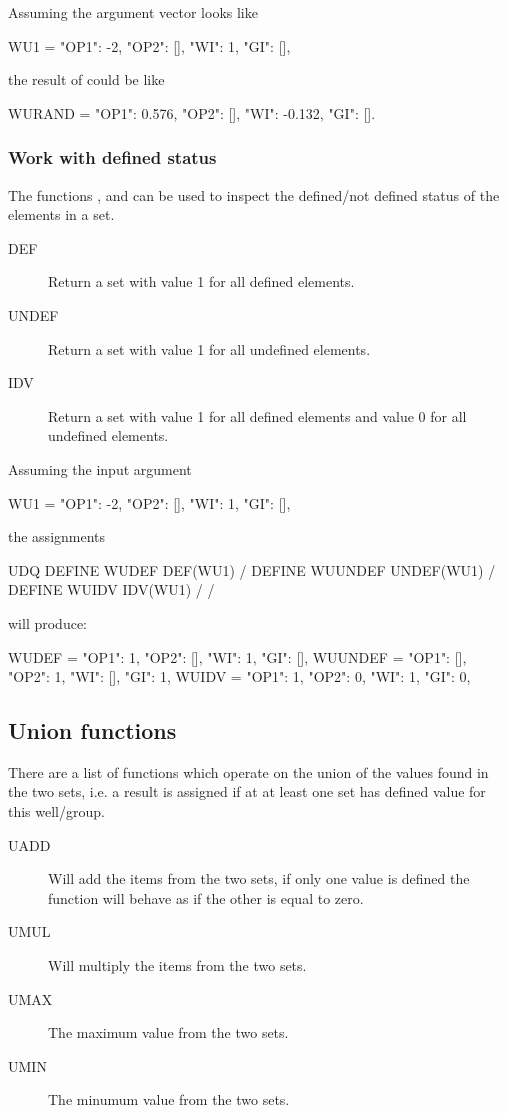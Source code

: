 Assuming the argument vector  looks like 
\begin{code}
  WU1 = {"OP1": -2, "OP2": [], "WI": 1, "GI": []},
\end{code}
the result of  could be like
\begin{code}
 WURAND = {"OP1": 0.576, "OP2": [], "WI": -0.132, "GI": []}.
\end{code}

\subsubsection*{Work with defined status}
The functions ,  and  can be used to inspect the
defined/not defined status of the elements in a \udq{} set.

\begin{description}
  \item[DEF] Return a set with value 1 for all defined elements.
  \item[UNDEF] Return a set with value 1 for all undefined elements.
  \item[IDV] Return a set with value 1 for all defined elements and value 0 for
    all undefined elements.
\end{description}

Assuming the input argument

\begin{code}
  WU1 = {"OP1": -2, "OP2": [], "WI": 1, "GI": []},
\end{code}

the \udq{} assignments

\begin{deck}
UDQ
  DEFINE WUDEF   DEF(WU1) /
  DEFINE WUUNDEF UNDEF(WU1) /
  DEFINE WUIDV   IDV(WU1) /
/
\end{deck}

will produce:

\begin{code}
  WUDEF   = {"OP1": 1,  "OP2": [], "WI": 1,  "GI": []},
  WUUNDEF = {"OP1": [], "OP2": 1,  "WI": [], "GI": 1},
  WUIDV   = {"OP1": 1,  "OP2": 0,  "WI": 1,  "GI": 0},
\end{code}



\subsection{Union functions}
\label{udq_union_functions}
There are a list of functions  which operate on the union of the values
found in the two sets, i.e. a result is assigned if at at least one set has
defined value for this well/group.
\begin{description}
\item[UADD] Will add the items from the two sets, if only one value is defined
  the function will behave as if the other is equal to zero.
\item[UMUL] Will multiply the items from the two sets.
\item[UMAX] The maximum value from the two sets.
\item[UMIN] The minumum value from the two sets.
\end{description}

